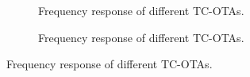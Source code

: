 
\begin{figure}[htbp]
  \centering
  \begin{subfigure}[b]{0.48\linewidth}
    \centering
    \caption{Frequency response of different TC-OTAs.}

  \end{subfigure}
  \hfill
  \begin{subfigure}[b]{0.48\linewidth}
    \centering
    \caption{Frequency response of different TC-OTAs.}

  \end{subfigure}
  \caption{Frequency response of different TC-OTAs.}

  \label{fig:group_ncpui}
\end{figure}
